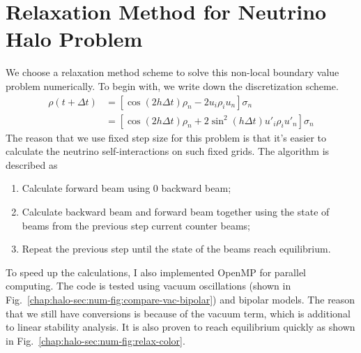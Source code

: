 \section{\label{chap:halo-sec:num}Relaxation Method for Neutrino Halo Problem}


We choose a relaxation method scheme to solve this non-local boundary value problem numerically. To begin with, we write down the discretization scheme.
\begin{align}
    \rho(t+\Delta t) &= \left[  \cos( 2 h \Delta t)\rho_n -  2 u_i \rho_i u_n \right]\sigma_n \\
    &= \left[  \cos( 2 h \Delta t) \rho_n +  2 \sin^2(h \Delta t) u'_i \rho_i u'_n \right]\sigma_n
\end{align}
The reason that we use fixed step size for this problem is that it's easier to calculate the neutrino self-interactions on such fixed grids. The algorithm is described as
\begin{enumerate}
    \item
Calculate forward beam using 0 backward beam;
\item
Calculate backward beam and forward beam together using the state of beams from the previous step current counter beams;
\item
Repeat the previous step until the state of the beams reach equilibrium.
\end{enumerate}
To speed up the calculations, I also implemented OpenMP for parallel computing. The code is tested using vacuum oscillations (shown in Fig.~\ref{chap:halo-sec:num-fig:compare-vac-bipolar}) and bipolar models. The reason that we still have conversions is because of the vacuum term, which is additional to linear stability analysis. It is also proven to reach equilibrium quickly as shown in Fig.~\ref{chap:halo-sec:num-fig:relax-color}. 

